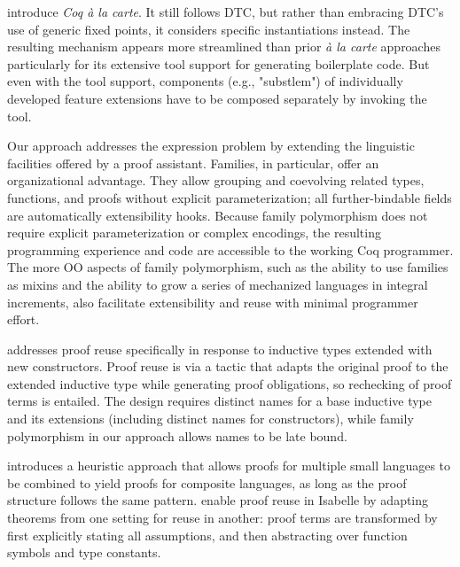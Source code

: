 \citet{forsta2020} introduce \emph{Coq à la carte}.
It still follows DTC, but rather than embracing DTC's use of generic
fixed points, it considers specific instantiations instead.
The resulting mechanism appears more streamlined than prior \emph{à la
carte} approaches particularly for its extensive tool support for generating boilerplate code.
%
But even with the tool support, components (e.g., "substlem") of
individually developed feature extensions have to be composed separately
by invoking the tool.
%

Our approach addresses the expression problem by extending the
linguistic facilities offered by a proof assistant.
Families, in particular, offer an organizational advantage.  They allow
grouping and coevolving related types, functions, and proofs without
explicit parameterization;
all further-bindable fields are automatically extensibility hooks.
Because family polymorphism does not require explicit parameterization
or complex encodings,
the resulting programming experience and code are accessible to the
working Coq programmer.
The more OO aspects of family polymorphism, such as the ability to
use families as mixins and the ability to grow a series of mechanized
languages in integral increments, also facilitate extensibility and
reuse
with minimal programmer effort.


\citet{boite2004proof} addresses proof reuse specifically in response
to inductive types extended with new constructors. Proof reuse is
via a tactic that adapts the original proof to the extended inductive
type while generating proof obligations, so rechecking of proof terms is
entailed.
The design requires distinct names for a base inductive type and its
extensions (including distinct names for constructors), while family
polymorphism in our approach allows names to be late bound.

\citet{mulhern2006proof} introduces a heuristic approach that allows proofs
for multiple small languages to be combined to yield proofs for
composite languages, as long as the proof structure follows the same
pattern.
%
\citet{johlut2004} enable proof reuse in Isabelle by adapting theorems
from one setting for reuse in another: proof terms are transformed
by first explicitly stating all assumptions, and then abstracting over
function symbols and type constants.


